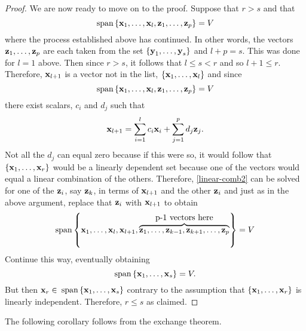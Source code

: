 \begin{proof}
  We are now ready to move on to the proof. Suppose that $r>s$ and
  that
  \begin{equation*}
    \sspan\set{\vect{x}_{1},\ldots,
      \vect{x}_{l},\vect{z}_{1},\ldots,\vect{z}_{p}} =V
  \end{equation*}
  where the process established above has continued. In other words,
  the vectors $\mbox{\bf z}_{1},\ldots,\mbox{\bf z}_{p}$ are each taken from
  the set $\left\{\mbox{\bf y}_{1},\ldots,\mbox{\bf y}_{s}\right\} $ and $l+p=s$.  This
  was done for $l=1$ above. Then since $r>s$, it follows that
  $ l\leq s<r$ and so $l+1\leq r$. Therefore, $\mbox{\bf x}_{l+1}$ is a
  vector not in the list, $\left\{\mbox{\bf x}_{1},\ldots,\mbox{\bf x}_{l}\right\} $
  and since
  \begin{equation*}
    \sspan\set{\vect{x}_{1},\ldots,\vect{x}_{l},\vect{z}
      _{1},\ldots,\vect{z}_{p}} =V
  \end{equation*}
  there exist scalars, $c_{i}$ and $
  d_{j}$ such that
  \begin{equation}
    \mbox{\bf x}_{l+1}=\sum_{i=1}^{l}c_{i}\mbox{\bf x}_{i}+\sum_{j=1}^{p}d_{j}
    \mbox{\bf z}_{j}.  \label{linear-comb2}
  \end{equation}
  Not all the $d_{j}$ can equal zero because if this were so, it would
  follow that $\left\{\mbox{\bf x}_{1},\ldots,\mbox{\bf x}_{r}\right\} $ would be a
  linearly dependent set because one of the vectors would equal a
  linear combination of the others. Therefore, {\eqref{linear-comb2}}
  can be solved for one of the $\mbox{\bf z}_{i}$, say $\mbox{\bf z}_{k}$, in
  terms of $\mbox{\bf x}_{l+1}$ and the other $\mbox{\bf z}_{i}$ and just as
  in the above argument, replace that $ \mbox{\bf z}_{i}$ with
  $\mbox{\bf x}_{l+1}$ to obtain
  \begin{equation*}
    \sspan\set{\vect{x}_{1},\ldots,\vect{x}_{l},\vect{x}_{l+1},
      \overset{\text{p-1 vectors here}}{\overbrace{\vect{z}_{1},\ldots,\vect{z}
          _{k-1},\vect{z}_{k+1},\ldots,\vect{z}_{p}}}} =V
  \end{equation*}
  Continue this way, eventually obtaining
  \begin{equation*}
    \sspan\set{\vect{x}_{1},\ldots,\vect{x}_{s}} =V.
  \end{equation*}
  But then $\mbox{\bf x}_{r}\in $
  $\sspan\set{\vect{x}_{1},\ldots, \vect{x}_{s}} $ contrary to the
  assumption that $\left\{\mbox{\bf x} _{1},\ldots,\mbox{\bf x}_{r}\right\} $ is
  linearly independent. Therefore, $ r\leq s$ as claimed.
\end{proof}

The following corollary follows from the exchange theorem.

